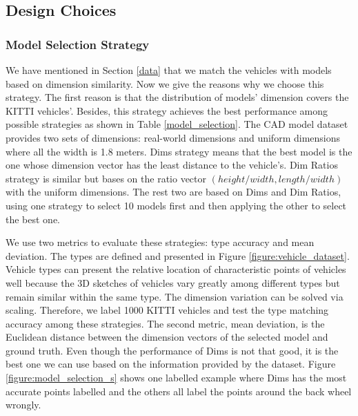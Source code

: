 \documentclass[a4paper,12pt]{article}
\begin{document}
\subsection{Design Choices}
\label{d_choices}

\subsubsection{Model Selection Strategy}
We have mentioned in Section \ref{data} that we match the vehicles with models based on dimension similarity. Now we give the reasons why we choose this strategy. The first reason is that the distribution of models' dimension covers the KITTI vehicles'. Besides, this strategy achieves the best performance among possible strategies as shown in Table \ref{model_selection}. The CAD model dataset provides two sets of dimensions: real-world dimensions and  uniform dimensions where all the width is 1.8 meters. Dims strategy means that the best model is the one whose dimension vector has the least distance to the vehicle's. Dim Ratios strategy is similar but bases on the ratio vector $(height/width, length/width)$ with the uniform dimensions. The rest two are based on Dims and Dim Ratios, \ie using one strategy to select 10 models first and then applying the other to select the best one.

We use two metrics to evaluate these strategies: type accuracy and mean deviation. The types are defined and presented in Figure \ref{figure:vehicle_dataset}. Vehicle types can present the relative location of characteristic points of vehicles well because the 3D sketches of vehicles vary greatly among different types but remain similar within the same type. The dimension variation can be solved via scaling. Therefore, we label 1000 KITTI vehicles and test the type matching accuracy among these strategies. The second metric, mean deviation, is the Euclidean distance between the dimension vectors of the selected model and ground truth. Even though the performance of Dims is not that good, it is the best one we can use based on the information provided by the dataset. Figure \ref{figure:model_selection_s} shows one labelled example where Dims has the most accurate points labelled and the others all label the points around the back wheel wrongly.

\renewcommand{\arraystretch}{1.2}
\begin{table}[ht]
	\centering
	\caption{Performance of four model selection strategies.}
	\label{model_selection}
\end{table}
\end{document}
